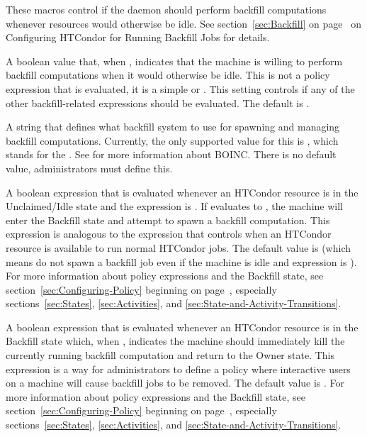 These macros control if the  daemon should perform
backfill computations whenever resources would otherwise be idle.  
See section~\ref{sec:Backfill} on page~\pageref{sec:Backfill} on
Configuring HTCondor for Running Backfill Jobs for details.

\begin{description}

\label{param:EnableBackfill}
\item[\Macro{ENABLE\_BACKFILL}]
  A boolean value that, when , indicates that the machine is willing
  to perform backfill computations when it would otherwise be idle.
  This is not a policy expression that is evaluated, it is a simple
   or .
  This setting controls if any of the other backfill-related
  expressions should be evaluated.
  The default is .

\label{param:BackfillSystem}
\item[\Macro{BACKFILL\_SYSTEM}]
  A string that defines what backfill system to use for spawning and managing
  backfill computations.
  Currently, the only supported value for this is , which
  stands for the .
  See  for more information about
  BOINC.
  There is no default value, administrators must define this.
  
\label{param:StartBackfill}
\item[\Macro{START\_BACKFILL}]
  A boolean expression that is evaluated whenever an HTCondor resource is in the
  Unclaimed/Idle state and the  expression
  is .  
  If  evaluates to , the machine
  will enter the Backfill state and attempt to spawn a backfill
  computation. 
  This expression is analogous to the  expression that
  controls when an HTCondor resource is available to run normal HTCondor
  jobs.
  The default value is  (which means do not spawn a
  backfill job even if the machine is idle and
   expression is ).
  For more information about policy expressions and the Backfill
  state, see section~\ref{sec:Configuring-Policy} beginning on
  page~\pageref{sec:Configuring-Policy}, especially
  sections~\ref{sec:States}, \ref{sec:Activities}, and
  \ref{sec:State-and-Activity-Transitions}.

\label{param:EvictBackfill}
\item[\Macro{EVICT\_BACKFILL}]
  A boolean expression that is evaluated whenever an HTCondor resource is in the
  Backfill state which, when , indicates the machine should
  immediately kill the currently running backfill computation and
  return to the Owner state.
  This expression is a way for administrators to define a policy where
  interactive users on a machine will cause backfill jobs to be
  removed.
  The default value is .
  For more information about policy expressions and the Backfill
  state, see section~\ref{sec:Configuring-Policy} beginning on
  page~\pageref{sec:Configuring-Policy}, especially
  sections~\ref{sec:States}, \ref{sec:Activities}, and
  \ref{sec:State-and-Activity-Transitions}.


\end{description}

